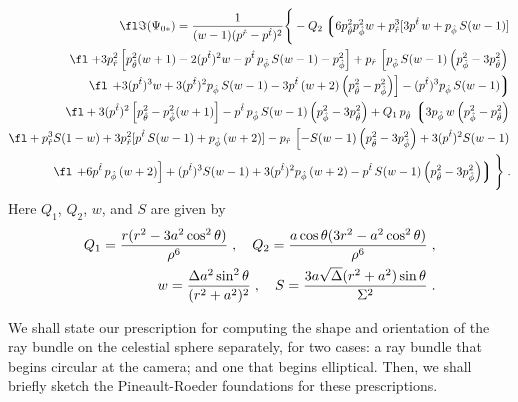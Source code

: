 \documentclass[12pt]{iopart}
\begin{document}
\begin{eqnarray}
\fl
\Im(\Psi_{0*}) = {1\over (w-1) (p^{\hat r}-p^{\hat t})^2}
\Bigg\{
-Q_2 \left\lgroup 6 p_{\hat \theta}^2 p_{\hat \phi}^2 w+p_{\hat r}^3 [3 p^{\hat t}\,
   w+p_{\hat \phi} \,S (w-1)]
   \right. \nonumber\\
\fl \left.
+3 p_{\hat r}^2 \left[p_{\hat \theta}^2 (w+1)-2 (p^{\hat t})^2 w     
   -p^{\hat t}\, p_{\hat \phi} \,S (w-1)-p_{\hat \phi}^2\right]+p_{\hat r}\, \left[p_{\hat \phi} \,S (w-1) \left(p_{\hat \phi}^2-3 p_{\hat \theta}^2\right) \right. \right. \nonumber\\
\fl \left.\left. 
+3 (p^{\hat t})^3 w+3
   (p^{\hat t})^2 p_{\hat \phi}\, S (w-1)
   -3 p^{\hat t} \,(w+2) \left(p_{\hat \theta}^2-p_{\hat \phi}^2\right)\right]-(p^{\hat t})^3 p_{\hat \phi} \,S (w-1)\right\rgroup
\nonumber\\
\fl
+3 (p^{\hat t})^2
   \left[p_{\hat \theta}^2-p_{\hat \phi}^2 (w+1)\right]-p^{\hat t}\, p_{\hat \phi} \,S
   (w-1) \left(p_{\hat \phi}^2-3 p_{\hat \theta}^2\right)
   +Q_1\,p_{\hat \theta}\,  \left\lgroup3 p_{\hat \phi} \,w \left(p_{\hat \phi}^2-p_{\hat \theta}^2\right)
   \right. \\
\fl
   +p_{\hat r}^3 S(1- w)+3 p_{\hat r}^2 [p^{\hat t} \,S (w-1)+p_{\hat \phi}\,
   (w+2)]-p_{\hat r}\, \left[-S (w-1) \left(p_{\hat \theta}^2-3 p_{\hat \phi}^2\right)
      +3 (p^{\hat t})^2 S (w-1)
   \right. \nonumber \\
\fl
\left. \left. 
+6 p^{\hat t} \,p_{\hat \phi} \,(w+2)\right]+(p^{\hat t})^3 S (w-1)+3
   (p^{\hat t})^2 p_{\hat \phi} \,(w+2)-p^{\hat t} \,S (w-1) \left(p_{\hat \theta}^2-3
   p_{\hat \phi}^2\right)\right\rgroup   \Bigg\}  \;. \nonumber
\label{eq:ImPsios}
    \end{eqnarray}
Here $Q_1$, $Q_2$, $w$, and $S$ are given by
\begin{eqnarray}
Q_1 = {r(r^2 - 3 a^2 \cos^2\theta)\over \rho^6}\;,\quad
Q_2 ={ a \cos\theta(3 r^2-a^2 \cos^2\theta) \over \rho^6}\;,\nonumber \\
w= {\Delta a^2 \sin^2\theta\over (r^2+a^2)^2}\;, \quad
S = {3 a \sqrt{\Delta}(r^2+a^2)\sin\theta \over \Sigma^2}\;.
\label{eq:Psios}
\end{eqnarray}

We shall state our prescription for computing the shape and orientation of the
ray bundle on the celestial sphere separately, for two cases: a ray bundle that
begins circular at the camera; and one that begins elliptical.  Then,  we shall
briefly sketch the Pineault-Roeder \cite{PR1,PR2} foundations for these prescriptions.
\end{document}
